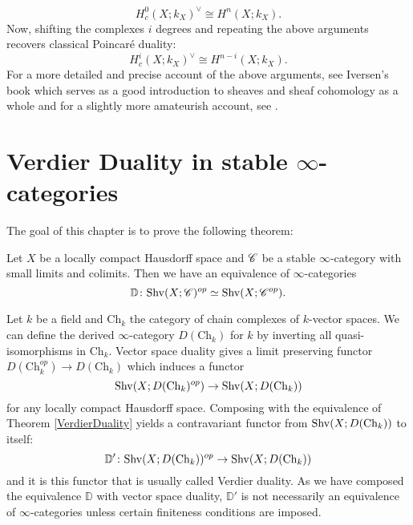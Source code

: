 \documentclass[../../thesis.tex]{subfiles}
\begin{document}
\[
    H^0_c(X; k_X)^{\vee} \cong H^n(X;k_X).
\]
Now, shifting the complexes $i$ degrees and repeating the above arguments recovers classical Poincaré duality:
\[
    H^i_c(X; k_X)^{\vee} \cong H^{n-i}(X;k_X).
\]
For a more detailed and precise account of the above arguments, see Iversen's book \cite{Iversen} which serves as a good introduction to sheaves and sheaf cohomology as a whole and for a slightly more amateurish account, see \cite{BACH}.

\section{Verdier Duality in stable $\infty$-categories}
The goal of this chapter is to prove the following theorem:
\begin{theorem}\label{VerdierDuality}
    Let $X$ be a locally compact Hausdorff space and $\mathscr{C}$ be a stable $\infty$-category with small limits and colimits.
    Then we have an equivalence of $\infty$-categories
    \[
        \mathbb{D} \colon \mathrm{Shv}(X;\mathscr{C})^{op} \simeq \mathrm{Shv}(X;\mathscr{C}^{op}).
    \]
\end{theorem}
Let $k$ be a field and $\mathrm{Ch}_k$ the category of chain complexes of $k$-vector spaces.
We can define the derived $\infty$-category $D(\mathrm{Ch}_k)$ for $k$ by inverting all quasi-isomorphisms in $\mathrm{Ch}_k$.
Vector space duality gives a limit preserving functor $D(\mathrm{Ch}_k^{op}) \to D(\mathrm{Ch}_k)$ which induces a functor
\[
    \mathrm{Shv}(X;D(\mathrm{Ch}_k)^{op}) \to \mathrm{Shv}(X;D(\mathrm{Ch}_k))
\]
for any locally compact Hausdorff space.
Composing with the equivalence of Theorem \ref{VerdierDuality} yields a contravariant functor from $\mathrm{Shv}(X;D(\mathrm{Ch}_k))$ to itself:
\[
    \mathbb{D}'\colon \mathrm{Shv}(X;D(\mathrm{Ch}_k))^{op} \to \mathrm{Shv}(X;D(\mathrm{Ch}_k))
\]
and it is this functor that is usually called Verdier duality. As we have composed the equivalence $\mathbb{D}$ with vector space duality, $\mathbb{D}'$ is not necessarily an equivalence of $\infty$-categories unless certain finiteness conditions are imposed.
\end{document}
